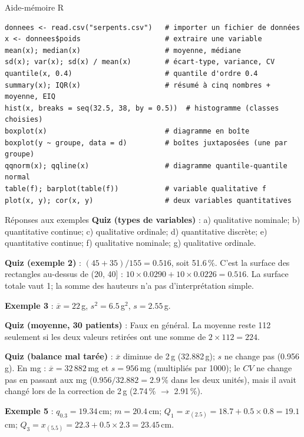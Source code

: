 \documentclass{BeamerTemplate}
\begin{document}
\begin{frame}[fragile,t]{Aide-mémoire R}
\begin{Verbatim}[fontsize=\scriptsize, formatcom=\color{TexteBoite}]
donnees <- read.csv("serpents.csv")   # importer un fichier de données
x <- donnees$poids                    # extraire une variable
mean(x); median(x)                    # moyenne, médiane
sd(x); var(x); sd(x) / mean(x)        # écart-type, variance, CV
quantile(x, 0.4)                      # quantile d'ordre 0.4
summary(x); IQR(x)                    # résumé à cinq nombres + moyenne, EIQ
hist(x, breaks = seq(32.5, 38, by = 0.5))  # histogramme (classes choisies)
boxplot(x)                            # diagramme en boîte
boxplot(y ~ groupe, data = d)         # boîtes juxtaposées (une par groupe)
qqnorm(x); qqline(x)                  # diagramme quantile-quantile normal
table(f); barplot(table(f))           # variable qualitative f
plot(x, y); cor(x, y)                 # deux variables quantitatives
\end{Verbatim}
\end{frame}

\begin{frame}[t]{Réponses aux exemples}
  \footnotesize
  \textbf{Quiz (types de variables)} : a) qualitative nominale;
  b) quantitative continue; c) qualitative ordinale; d) quantitative discrète;
  e) quantitative continue; f) qualitative nominale; g) qualitative ordinale.

  \medskip
  \textbf{Quiz (exemple 2)} : $(45 + 35)/155 = 0.516$, soit 51.6\,\%. C'est la
  surface des rectangles au-dessus de (20, 40] :
  $10 \times 0.0290 + 10 \times 0.0226 = 0.516$. La surface totale vaut 1; la
  somme des hauteurs n'a pas d'interprétation simple.

  \medskip
  \textbf{Exemple 3} : $\overline{x} = 22$\,g, $s^2 = 6.5$\,g$^2$,
  $s = 2.55$\,g.

  \medskip
  \textbf{Quiz (moyenne, 30 patients)} : Faux en général. La moyenne reste 112
  seulement si les deux valeurs retirées ont une somme de
  $2 \times 112 = 224$.

  \medskip
  \textbf{Quiz (balance mal tarée)} : $\overline{x}$ diminue de 2\,g
  (32.882\,g); $s$ ne change pas (0.956\,g). En mg : $\overline{x} =
  32\,882$\,mg et $s = 956$\,mg (multipliés par 1000); le $CV$ ne change pas
  en passant aux mg ($0.956/32.882 = 2.9\,\%$ dans les deux unités), mais il
  avait changé lors de la correction de 2\,g (2.74\,\% $\rightarrow$
  2.91\,\%).

  \medskip
  \textbf{Exemple 5} : $q_{0.3} = 19.34$\,cm; $m = 20.4$\,cm;
  $Q_1 = x_{(2.5)} = 18.7 + 0.5 \times 0.8 = 19.1$\,cm;
  $Q_3 = x_{(5.5)} = 22.3 + 0.5 \times 2.3 = 23.45$\,cm.
\end{frame}
\end{document}
